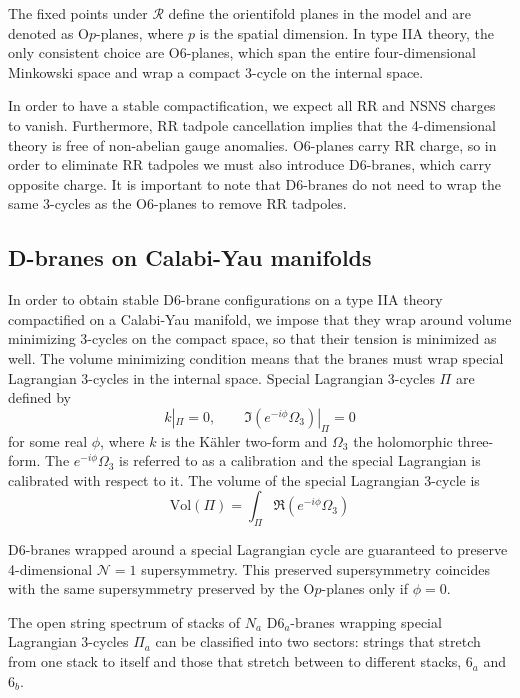 The fixed points under $\mathcal R$ define the orientifold planes in the model and are denoted
as O$p$-planes, where $p$ is the spatial dimension.
In type IIA theory, the only consistent choice are O$6$-planes,
which span the entire four-dimensional Minkowski space and wrap a compact $3$-cycle on the internal space.

In order to have a stable compactification, we expect all RR and NSNS charges to vanish.
Furthermore, RR tadpole cancellation implies that the 4-dimensional theory is free of non-abelian gauge anomalies.
O$6$-planes carry RR charge, so in order to eliminate RR tadpoles we must also introduce D$6$-branes,
which carry opposite charge.
It is important to note that D$6$-branes do not need to wrap the same 3-cycles as the O$6$-planes
to remove RR tadpoles.

\subsection{D-branes on Calabi-Yau manifolds}

In order to obtain stable D6-brane configurations on a type IIA theory compactified on a Calabi-Yau manifold, 
we impose that they wrap around volume minimizing 3-cycles on the compact space, so that their tension is minimized as well.
The volume minimizing condition means that the branes must wrap special Lagrangian 3-cycles in the internal space.
Special Lagrangian 3-cycles $\Pi$ are defined by
\begin{equation}
  k|_\Pi = 0 , \qquad \Im (e^{-i\phi}\Omega_3)|_\Pi=0
\end{equation}
for some real $\phi$, where $k$ is the Kähler two-form and $\Omega_3$ the holomorphic three-form.
The $e^{-i\phi}\Omega_3$ is referred to as a calibration and the special Lagrangian is calibrated with respect to it.%
The volume of the special Lagrangian 3-cycle is
\begin{equation}
  \mathrm{Vol}(\Pi)=\int_\Pi \Re(e^{-i\phi}\Omega_3)
\end{equation}

D6-branes wrapped around a special Lagrangian cycle are guaranteed to preserve 4-dimensional $\mathcal N=1$ supersymmetry. 
This preserved supersymmetry coincides with the same supersymmetry preserved by the O$p$-planes only if $\phi=0$.

The open string spectrum of stacks of $N_a$ D$6_a$-branes wrapping special Lagrangian 3-cycles $\Pi_a$ 
can be classified into two sectors: strings that stretch from one stack to itself and those that stretch between to different stacks, $6_a$ and $6_b$.

